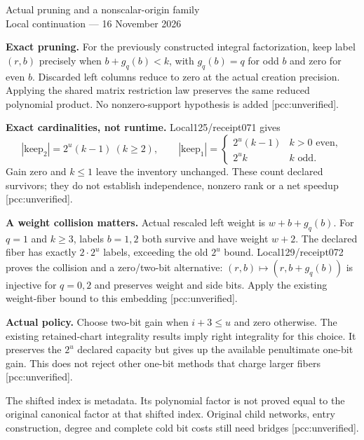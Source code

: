 \documentclass[10pt]{article}
\begin{document}
\begin{center}{\Large Actual pruning and a nonscalar-origin family}\\[4pt]
Local continuation --- 16 November 2026\end{center}
\textbf{Exact pruning.} For the previously constructed integral factorization,
keep label $(r,b)$ precisely when $b+g_q(b)<k$, with $g_q(b)=q$ for odd $b$
and zero for even $b$. Discarded left columns reduce to zero at the actual
creation precision. Applying the shared matrix restriction law preserves
the same reduced polynomial product. No nonzero-support hypothesis is added
[pcc:unverified].

\textbf{Exact cardinalities, not runtime.} Local125/receipt071 gives
\[
|\mathrm{keep}_2|=2^u(k-1)\ (k\ge2),\qquad
|\mathrm{keep}_1|=\begin{cases}2^u(k-1)&k>0\text{ even},\\2^u k&k\text{ odd}.
\end{cases}
\]
Gain zero and $k\le1$ leave the inventory unchanged. These count declared
survivors; they do not establish independence, nonzero rank or a net speedup
[pcc:unverified].

\textbf{A weight collision matters.} Actual rescaled left weight is
$w+b+g_q(b)$. For $q=1$ and $k\ge3$, labels $b=1,2$ both survive and have
weight $w+2$. The declared fiber has exactly $2\cdot2^u$ labels, exceeding
the old $2^u$ bound. Local129/receipt072 proves the collision and a zero/two-bit
alternative: $(r,b)\mapsto(r,b+g_q(b))$ is injective for $q=0,2$ and preserves
weight and side bits. Apply the existing weight-fiber bound to this embedding
[pcc:unverified].

\textbf{Actual policy.} Choose two-bit gain when $i+3\le u$ and zero otherwise.
The existing retained-chart integrality results imply right integrality for
this choice. It preserves the $2^u$ declared capacity but gives up the
available penultimate one-bit gain. This does not reject other one-bit
methods that charge larger fibers [pcc:unverified].

The shifted index is metadata. Its polynomial factor is not proved equal to
the original canonical factor at that shifted index. Original child networks,
entry construction, degree and complete cold bit costs still need bridges [pcc:unverified].
\end{document}
